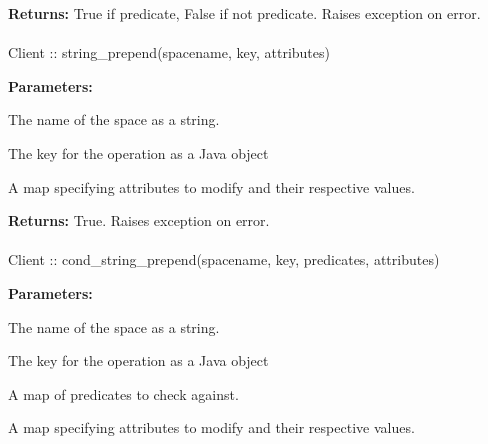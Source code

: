 \noindent\textbf{Returns:}
True if predicate, False if not predicate.  Raises exception on error.

\paragraph{}
\label{api:java:string_prepend}
\begin{javacode}
Client :: string_prepend(spacename, key, attributes)
\end{javacode}
\funcdesc 

\noindent\textbf{Parameters:}
\begin{description}[labelindent=\widthof{{\code{attributes}}},leftmargin=*,noitemsep,nolistsep,align=right]
\item[\code{spacename}] The name of the space as a string.
\item[\code{key}] The key for the operation as a Java object
\item[\code{attributes}] A map specifying attributes to modify and their respective values.
\end{description}

\noindent\textbf{Returns:}
True.  Raises exception on error.

\paragraph{}
\label{api:java:cond_string_prepend}
\begin{javacode}
Client :: cond_string_prepend(spacename, key, predicates, attributes)
\end{javacode}
\funcdesc 

\noindent\textbf{Parameters:}
\begin{description}[labelindent=\widthof{{\code{predicates}}},leftmargin=*,noitemsep,nolistsep,align=right]
\item[\code{spacename}] The name of the space as a string.
\item[\code{key}] The key for the operation as a Java object
\item[\code{predicates}] A map of predicates to check against.
\item[\code{attributes}] A map specifying attributes to modify and their respective values.
\end{description}

